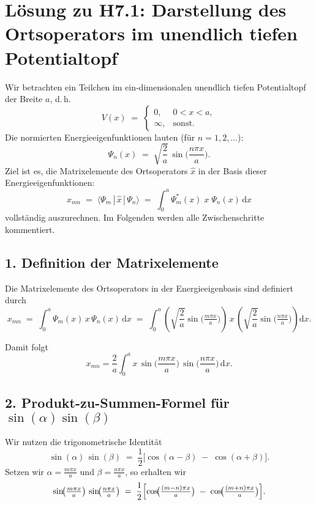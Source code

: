 \documentclass{scrartcl}
\begin{document}
\section*{Lösung zu H7.1: Darstellung des Ortsoperators im unendlich tiefen Potentialtopf}

Wir betrachten ein Teilchen im ein-dimensionalen unendlich tiefen Potentialtopf der Breite $a$, d.\,h.
\[
V(x) \;=\;
\begin{cases}
0, & 0 < x < a,\\
\infty, & \text{sonst}.
\end{cases}
\]
Die normierten Energieeigenfunktionen lauten (für $n=1,2,\dots$):
\[
\Psi_n(x) \;=\; \sqrt{\frac{2}{a}} \,\sin\!\biggl(\frac{n\pi x}{a}\biggr).
\]
Ziel ist es, die Matrixelemente des Ortsoperators $\hat{x}$ in der Basis dieser Energieeigenfunktionen:
\[
x_{mn} \;=\;\langle \Psi_m \,|\, \hat{x} \,|\, \Psi_n \rangle \;=\; 
\int_{0}^{a} \Psi_m^*(x)\; x \; \Psi_n(x)\,\mathrm{d}x
\]
vollständig auszurechnen. Im Folgenden werden alle Zwischenschritte kommentiert.

\bigskip

\subsection*{1. Definition der Matrixelemente}

Die Matrixelemente des Ortsoperators in der Energieeigenbasis sind definiert durch
\begin{equation}
x_{mn} \;=\; \int_{0}^{a} \Psi_m(x)\,x\,\Psi_n(x)\,\mathrm{d}x
\;=\; \int_{0}^{a} \left(\sqrt{\frac{2}{a}}\sin\!\biggl(\tfrac{m\pi x}{a}\biggr)\right)
\,x\,\left(\sqrt{\frac{2}{a}}\sin\!\biggl(\tfrac{n\pi x}{a}\biggr)\right)\mathrm{d}x.
\label{eq:matrixelement-definition}
\end{equation}

Damit folgt
\[
x_{mn} 
= \frac{2}{a} \int_{0}^{a} x \,\sin\!\biggl(\frac{m\pi x}{a}\biggr)\,\sin\!\biggl(\frac{n\pi x}{a}\biggr)\,\mathrm{d}x.
\]

\subsection*{2. Produkt-zu-Summen-Formel für \(\sin(\alpha)\sin(\beta)\)}

Wir nutzen die trigonometrische Identität
\[
\sin(\alpha)\,\sin(\beta)
\;=\;\frac{1}{2}\bigl[\cos(\alpha - \beta) \;-\; \cos(\alpha + \beta)\bigr].
\]
Setzen wir \(\alpha = \tfrac{m\pi x}{a}\) und \(\beta = \tfrac{n\pi x}{a}\), so erhalten wir
\[
\sin\!\bigl(\tfrac{m\pi x}{a}\bigr)\,\sin\!\bigl(\tfrac{n\pi x}{a}\bigr)
\;=\;\frac{1}{2}\Bigl[\cos\!\bigl(\tfrac{(m-n)\pi x}{a}\bigr) \;-\; \cos\!\bigl(\tfrac{(m+n)\pi x}{a}\bigr)\Bigr].
\]
\end{document}
